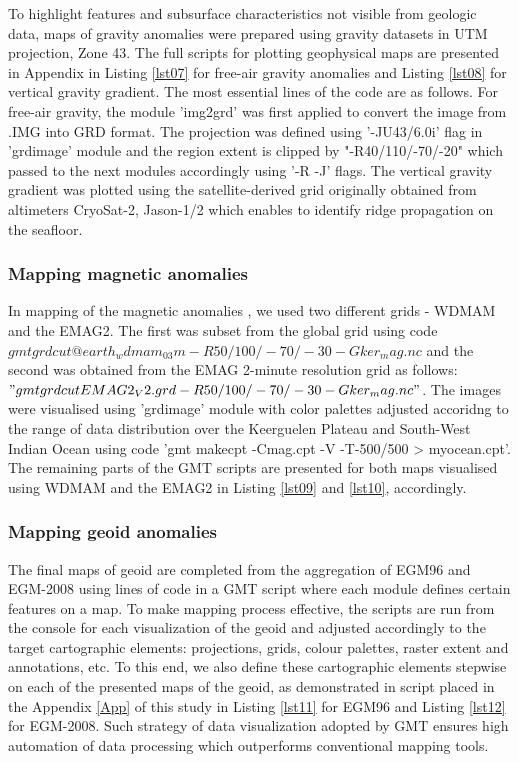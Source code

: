 \documentclass[geomatics,article,submit,pdftex,moreauthors]{Definitions/mdpi}
\begin{document}
To highlight features and subsurface characteristics not visible from geologic data, maps of gravity anomalies were prepared using gravity datasets in UTM projection, Zone 43. The full scripts for plotting geophysical maps are presented in Appendix in Listing \ref{lst07} for free-air gravity anomalies and Listing \ref{lst08} for vertical gravity gradient. The most essential lines of the code are as follows. For free-air gravity, the module 'img2grd' was first applied to convert the image from .IMG into GRD format. The projection was defined using '-JU43/6.0i' flag in 'grdimage' module and the region extent is clipped by "-R40/110/-70/-20" which passed to the next modules accordingly using '-R -J' flags. The vertical gravity gradient was plotted using the satellite-derived grid originally obtained from altimeters CryoSat-2, Jason-1/2 \cite{Harper} which enables to identify ridge propagation on the seafloor.

\subsubsection{Mapping magnetic anomalies}

In mapping of the magnetic anomalies , we used two different grids - WDMAM and the EMAG2. The first was subset from the global grid using code $gmt grdcut @earth_wdmam_03m -R50/100/-70/-30 -Gker_mag.nc$ and the second was obtained from the EMAG 2-minute resolution grid as follows: $"gmt grdcut EMAG2_V2.grd -R50/100/-70/-30 -Gker_mag.nc"$. The images were visualised using 'grdimage' module with color palettes adjusted accoridng to the range of data distribution over the Keerguelen Plateau and South-West Indian Ocean using code 'gmt makecpt -Cmag.cpt -V -T-500/500 > myocean.cpt'. The remaining parts of the GMT scripts are presented for both maps visualised using WDMAM and the EMAG2 in Listing \ref{lst09} and \ref{lst10}, accordingly.

\subsubsection{Mapping geoid anomalies}

The final maps of geoid are completed from the aggregation of EGM96 and EGM-2008 using lines of code in a GMT script where each module defines certain features on a map. To make mapping process effective, the scripts are run from the console for each visualization of the geoid and adjusted accordingly to the target cartographic elements: projections, grids, colour palettes, raster extent and annotations, etc. To this end, we also define these cartographic elements stepwise on each of the presented maps of the geoid, as demonstrated in script placed in the Appendix \ref{App} of this study in Listing \ref{lst11} for EGM96 and Listing \ref{lst12} for EGM-2008. Such strategy of data visualization adopted by GMT ensures high automation of data processing which outperforms conventional mapping tools.
\end{document}
